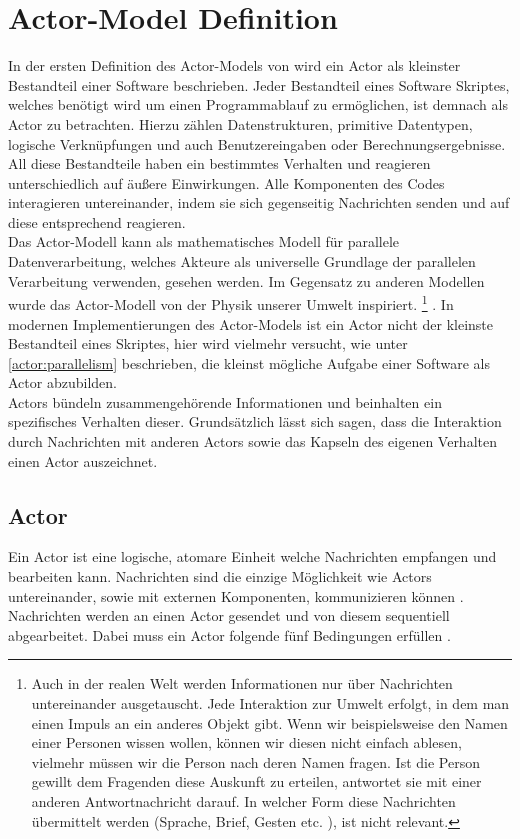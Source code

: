 \section{Actor-Model Definition}\label{actor:definition}
In der ersten Definition des Actor-Models von \citep{hewitt1973session} wird ein Actor als kleinster Bestandteil einer Software beschrieben. Jeder Bestandteil eines Software Skriptes, welches benötigt wird um einen Programmablauf zu ermöglichen, ist demnach als Actor zu betrachten. Hierzu zählen Datenstrukturen,  primitive Datentypen, logische Verknüpfungen und auch Benutzereingaben oder Berechnungsergebnisse. All diese Bestandteile haben ein bestimmtes Verhalten und reagieren unterschiedlich auf äußere Einwirkungen. Alle Komponenten des Codes interagieren untereinander, indem sie sich gegenseitig Nachrichten senden und auf diese entsprechend reagieren.\\
Das Actor-Modell kann als mathematisches Modell für parallele Datenverarbeitung, welches Akteure als universelle Grundlage der parallelen Verarbeitung verwenden, gesehen werden. Im Gegensatz zu anderen Modellen wurde das Actor-Modell von der Physik unserer Umwelt inspiriert. \footnote{Auch in der realen Welt werden Informationen nur über Nachrichten untereinander ausgetauscht. Jede Interaktion zur Umwelt erfolgt, in dem man einen Impuls an ein anderes Objekt gibt. Wenn wir beispielsweise den Namen einer Personen wissen wollen, können wir diesen nicht einfach ablesen, vielmehr müssen wir die Person nach deren Namen fragen. Ist die Person gewillt dem Fragenden diese Auskunft zu erteilen, antwortet sie mit einer anderen Antwortnachricht darauf. In welcher Form diese Nachrichten übermittelt werden (Sprache, Brief, Gesten etc. ), ist nicht relevant.} \citep{Vernon2015ReactiveAkka} .  In modernen Implementierungen des Actor-Models ist ein Actor nicht der kleinste Bestandteil eines Skriptes, hier wird vielmehr versucht, wie unter \ref{actor:parallelism}  beschrieben, die kleinst mögliche Aufgabe einer Software als Actor abzubilden. \\
Actors bündeln zusammengehörende Informationen und beinhalten ein spezifisches Verhalten dieser.  Grundsätzlich lässt sich sagen, dass die Interaktion durch Nachrichten mit anderen Actors sowie das Kapseln des eigenen Verhalten einen Actor auszeichnet.

\subsection{Actor}
Ein Actor ist eine logische, atomare Einheit welche Nachrichten empfangen und bearbeiten kann. Nachrichten sind die einzige Möglichkeit wie Actors untereinander, sowie mit externen Komponenten, kommunizieren können \citep{Agha1985ConcurrentParallelism}. Nachrichten werden an einen Actor gesendet und von diesem sequentiell abgearbeitet. Dabei muss ein Actor folgende fünf Bedingungen erfüllen \citep{Agha1985ConcurrentParallelism}.

